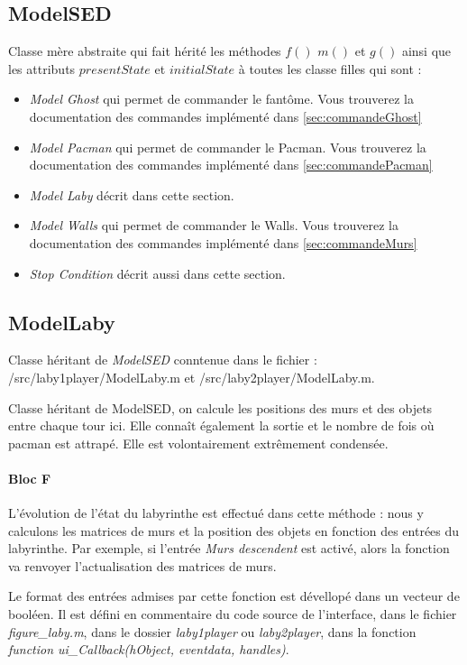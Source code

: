\subsection{ModelSED} 
Classe mère abstraite qui fait hérité les méthodes $f()$ $m()$ et $g()$ ainsi que les attributs $presentState$ et $initialState$ à toutes les classe filles qui sont : \begin{itemize}
\item [\textbullet] \emph{Model Ghost} qui permet de commander le fantôme. Vous trouverez la documentation des commandes implémenté dans \ref{sec:commandeGhost}
\item [\textbullet] \emph{Model Pacman} qui permet de commander le Pacman. Vous trouverez la documentation des commandes implémenté dans \ref{sec:commandePacman}
\item [\textbullet] \emph{Model Laby} décrit dans cette section.
\item [\textbullet] \emph{Model Walls} qui permet de commander le Walls. Vous trouverez la documentation des commandes implémenté dans \ref{sec:commandeMurs}
\item [\textbullet] \emph{Stop Condition} décrit aussi dans cette section.
\end{itemize}


\subsection{ModelLaby}\label{subsec:ModelLaby}
\begin{center}
Classe héritant de \emph{ModelSED} conntenue dans le fichier : /src/laby1player/ModelLaby.m et /src/laby2player/ModelLaby.m.
\end{center}
Classe héritant de ModelSED, on calcule les positions des murs et des objets entre chaque tour ici. Elle connaît également la sortie et le nombre de fois où pacman est attrapé. Elle est volontairement extrêmement condensée.
\paragraph*{Bloc F}
L'évolution de l'état du labyrinthe est effectué dans cette méthode : nous y calculons les matrices de murs et la position des objets en fonction des entrées du labyrinthe. Par exemple, si l'entrée \emph{Murs descendent} est activé, alors la fonction va renvoyer l'actualisation des matrices de murs.

Le format des entrées admises par cette fonction est dévellopé dans un vecteur de booléen. Il est défini en commentaire du code source de l'interface, dans le fichier \emph{figure\_laby.m}, dans le dossier \emph{laby1player} ou \emph{laby2player}, dans la fonction \textit{function ui\_Callback(hObject, eventdata, handles)}. 
